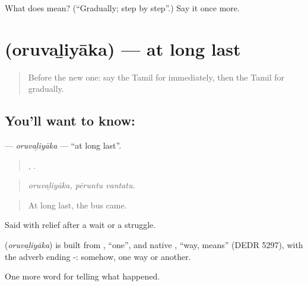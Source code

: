 \begin{tcolorbox}[breakable,colback=teal!4,colframe=teal!35!black,title={Before you move on}]
What does  mean? (\textquotedblleft{}Gradually; step by step\textquotedblright{}.) Say it once more.
\end{tcolorbox}
\section[\texorpdfstring{\ta{ஒருவழியாக} (oruvaḻiyāka)}{ஒருவழியாக (oruvaḻiyāka)}]{ (oruvaḻiyāka) — at long last}

\label{lesson:TA-C313-oruvaliyaka}



\begin{quote}
Before the new one: say the Tamil for immediately, then the Tamil for gradually.
\end{quote}

\subsection*{You'll want to know: }
\textbf{} — \emph{oruvaḻiyāka} — \textquotedblleft{}at long last\textquotedblright{}.

\begin{quote}
,  .
\end{quote}

\begin{quote}
\emph{oruvaḻiyāka, pēruntu vantatu.}
\end{quote}

\begin{quote}
At long last, the bus came.
\end{quote}

Said with relief after a wait or a struggle.

\begin{cousinweb}
\textbf{} (\emph{oruvaḻiyāka}) is built from , \textquotedblleft{}one\textquotedblright{}, and native , \textquotedblleft{}way, means\textquotedblright{} (DEDR 5297), with the adverb ending -: somehow, one way or another.
\end{cousinweb}

\begin{grammarlens}[title={What you've built}]
One more word for telling what happened.
\end{grammarlens}

